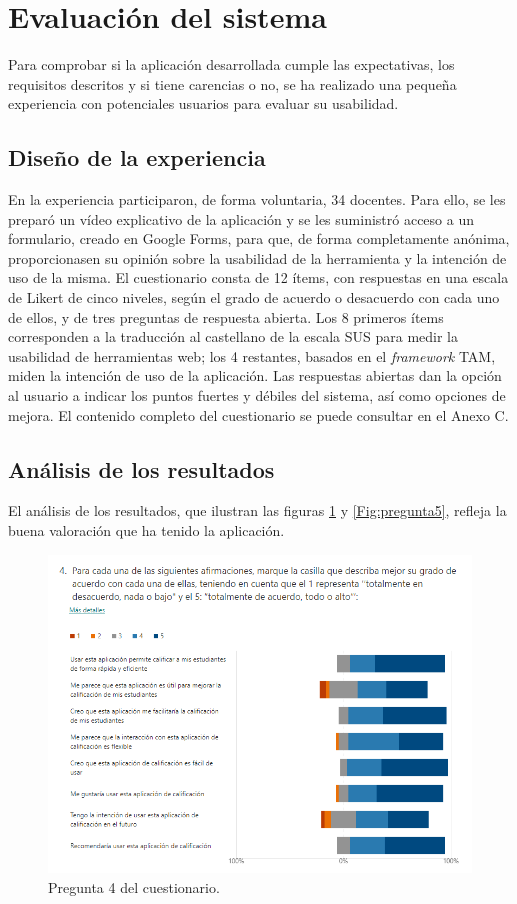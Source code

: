 \section{Evaluación del sistema}
\label{sub:pruebausabilidad}
Para comprobar si la aplicación desarrollada cumple las expectativas, los requisitos descritos y si tiene carencias o no, se ha realizado una pequeña experiencia con potenciales usuarios para evaluar su usabilidad.

\subsection{Diseño de la experiencia}
En la experiencia participaron, de forma voluntaria, 34 docentes. Para ello, se les preparó un vídeo explicativo de la aplicación y se les suministró acceso a un formulario, creado en Google Forms, para que, de forma completamente anónima, proporcionasen su opinión sobre la usabilidad de la herramienta y la intención de uso de la misma. El cuestionario consta de 12 ítems, con respuestas en una escala de Likert de cinco niveles, según el grado de acuerdo o desacuerdo con cada uno de ellos, y de tres preguntas de respuesta abierta. Los 8 primeros ítems corresponden a la traducción al castellano de la escala SUS\cite{sus} para medir la usabilidad de herramientas web; los 4 restantes, basados en el \textit{framework} TAM\cite{tam}, miden la intención de uso de la aplicación. Las respuestas abiertas dan la opción al usuario a indicar los puntos fuertes y débiles del sistema, así como opciones de mejora. El contenido completo del cuestionario se puede consultar en el Anexo C.

\subsection{Análisis de los resultados}

El análisis de los resultados, que ilustran las figuras \ref{Fig:pregunta4} y \ref{Fig:pregunta5}, refleja la buena valoración que ha tenido la aplicación.

\begin{figure}[h]
\centering\includegraphics[width=1\linewidth]{figs/pregunta4.png}
\caption{Pregunta 4 del cuestionario.}
\label{Fig:pregunta4}
\end{figure}

